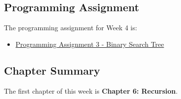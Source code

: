 \subsection{Programming Assignment}

The programming assignment for Week 4 is:

\begin{itemize}
    \item \href{https://github.com/QuantumCompiler/CU/tree/main/CSPB%202270%20-%20Data%20Structures/Assignments/Assignment%203%20-%20Binary%20Search%20Tree}{Programming Assignment 3 - Binary Search Tree}
\end{itemize}

\newpage

\subsection{Chapter Summary}

The first chapter of this week is \textbf{Chapter 6: Recursion}.

